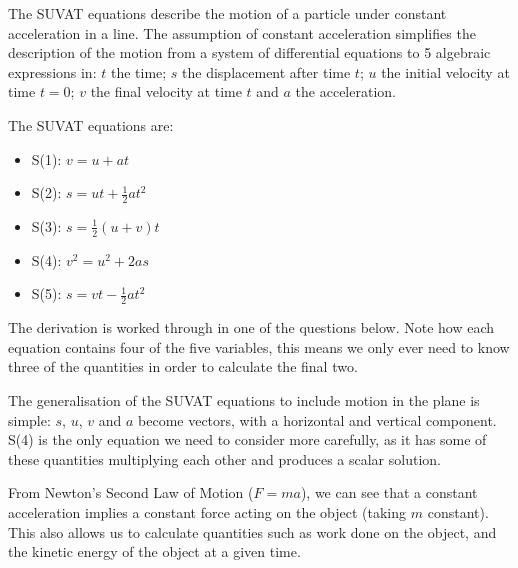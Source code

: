 The SUVAT equations describe the motion of a particle under constant acceleration in a line. The assumption of constant acceleration simplifies the description of the motion from a system of differential equations to 5 algebraic expressions in: $t$ the time; $s$ the displacement after time $t$; $u$ the initial velocity at time $t=0$; $v$ the final velocity at time $t$ and $a$ the acceleration. 

The SUVAT equations are:
\begin{itemize}
	\item S(1): $v = u+at$ 
    \item S(2): $s=ut+\frac{1}{2}at^2$
    \item S(3): $s = \frac{1}{2}(u+v)t$
    \item S(4): $v^2 = u^2 + 2as$
    \item S(5): $s=vt-\frac{1}{2}at^2$
\end{itemize}
The derivation is worked through in one of the questions below. Note how each equation contains four of the five variables, this means we only ever need to know three of the quantities in order to calculate the final two.

The generalisation of the SUVAT equations to include motion in the plane is simple: $s$, $u$, $v$ and $a$ become vectors, with a horizontal and vertical component. S(4) is the only equation we need to consider more carefully, as it has some of these quantities multiplying each other and produces a scalar solution.

From Newton's Second Law of Motion ($F=ma$), we can see that a constant acceleration implies a constant force acting on the object (taking $m$ constant). This also allows us to calculate quantities such as work done on the object, and the kinetic energy of the object at a given time. 